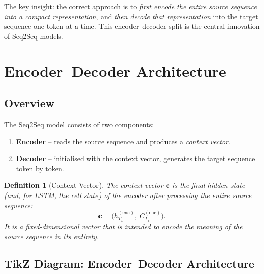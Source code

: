 \documentclass[12pt,a4paper]{article}
\newtheorem{definition}{Definition}[section]
\begin{document}
The key insight: the correct approach is to \emph{first encode the entire source sequence into a
compact representation}, and \emph{then decode that representation} into the target sequence one
token at a time. This encoder--decoder split is the central innovation of Seq2Seq models.

\section{Encoder--Decoder Architecture}
\label{sec:architecture}

\subsection{Overview}

The Seq2Seq model consists of two components:
\begin{enumerate}[noitemsep]
  \item \textbf{Encoder} -- reads the source sequence and produces a \emph{context vector}.
  \item \textbf{Decoder} -- initialised with the context vector, generates the target sequence
        token by token.
\end{enumerate}

\begin{definition}[Context Vector]
  \label{def:context_vector}
  The \emph{context vector} $\mathbf{c}$ is the final hidden state (and, for LSTM, the cell
  state) of the encoder after processing the entire source sequence:
  \[
    \mathbf{c} = \bigl(h_{T_x}^{(\text{enc})},\; C_{T_x}^{(\text{enc})}\bigr).
  \]
  It is a fixed-dimensional vector that is intended to encode the \emph{meaning} of the source
  sequence in its entirety.
\end{definition}

\subsection{TikZ Diagram: Encoder--Decoder Architecture}
\label{subsec:enc_dec_diagram}
\end{document}
